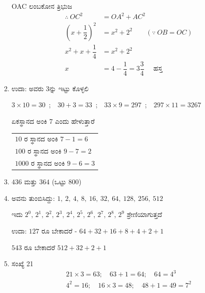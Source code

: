 \begin{enumerate}
OAC ಲಂಬಕೋನ ತ್ರಿಭುಜ 
\begin{align*}
\therefore~ OC^{2} & = OA^{2} + AC^{2}\\
\left(x + \dfrac{1}{2}\right)^{2} & = x^{2} + 2^{2} \qquad(\because~ OB = OC)\\
x^{2} + x + \dfrac{1}{4} & = x^{2} + 2^{2}\\
x & = 4 - \dfrac{1}{4} = 3\dfrac{3}{4} \quad\text{ ಹಸ್ತ}
\end{align*}

\item  ಉದಾ: ಅವರು 3ನ್ನು ಇಟ್ಟು ಕೊಳ್ಳಲಿ 

$3 \times 10 = 30$~;~~$30 + 3 = 33$~;~~$33 \times 9 = 297$~;~~$297 \times 11 = 3267$ 

ಏಕಸ್ಥಾನದ ಅಂಕಿ 7 ಎಂದು ಹೇಳುತ್ತಾರೆ 

\begin{tabular}{l}
$10$ ರ ಸ್ಥಾನದ ಅಂಕಿ $7-1 = 6$\\
$100$ ರ ಸ್ಥಾನದ ಅಂಕಿ $9-7 = 2$\\
$1000$ ರ ಸ್ಥಾನದ ಅಂಕಿ $9-6 = 3$
\end{tabular}

\item $436$ ಮತ್ತು $364$ (ಒಟ್ಟು $800$)

\item ಅವನು ತುಂಬಿಸಿದ್ದು: $1, ~2, ~4, ~8, ~16, ~32, ~64, ~128, ~256, ~512$

ಇದು $2^{0}$,  $2^{1}$, $2^{2}$,  $2^{3}$,  $2^{4}$, $2^{5}$, $2^{6}$, $2^{7}$, $2^{8}$, $2^{9}$ ಶ್ರೇಣಿಯಾಗುತ್ತದೆ 

ಉದಾ: $127$ ರೂ ಬೇಕಾದರೆ - $64 + 32 + 16 + 8 + 4 + 2 + 1$

$543$ ರೂ ಬೇಕಾದರೆ $512 + 32 + 2 +1$

\item ಸಂಖ್ಯೆ 21
\begin{gather*}
21 \times 3=63;\quad 63+1=64;\quad 64=4^{3}\\
4^{2}=16;\quad 16\times 3=48;\quad 48+1=49=7^{2}
\end{gather*}
\end{enumerate}

